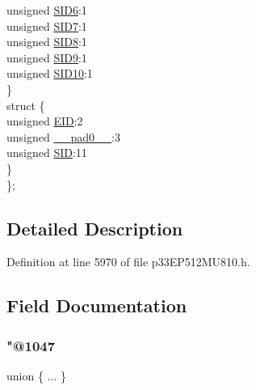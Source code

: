 \begin{DoxyCompactItemize}
\begin{tabbing}
\>\>unsigned \hyperlink{structtag_c2_r_x_m1_s_i_d_b_i_t_s_a70d70952133eb2389d5c326f9f0e8035}{SID6}:1\\
\>\>unsigned \hyperlink{structtag_c2_r_x_m1_s_i_d_b_i_t_s_a34097fb76decd431701fa2d86a22328e}{SID7}:1\\
\>\>unsigned \hyperlink{structtag_c2_r_x_m1_s_i_d_b_i_t_s_afe74894633244fdb0b0c01b4e8c522e7}{SID8}:1\\
\>\>unsigned \hyperlink{structtag_c2_r_x_m1_s_i_d_b_i_t_s_a33587704948067005c2a6a3ccc503c99}{SID9}:1\\
\>\>unsigned \hyperlink{structtag_c2_r_x_m1_s_i_d_b_i_t_s_a1a9084031c7f5fb16007feeebf0d8216}{SID10}:1\\
\>\} \\
\>struct \{\\
\>\>unsigned \hyperlink{structtag_c2_r_x_m1_s_i_d_b_i_t_s_ae80b378c9141f7c03e0b4e55b5f4b54d}{EID}:2\\
\>\>unsigned \hyperlink{structtag_c2_r_x_m1_s_i_d_b_i_t_s_adf71f3d8410c1f1dbbc96680a92c49af}{\_\_pad0\_\_}:3\\
\>\>unsigned \hyperlink{structtag_c2_r_x_m1_s_i_d_b_i_t_s_af88edf93b2fee2432665bd84f51287e4}{SID}:11\\
\>\} \\
\}; \\

\end{tabbing}\end{DoxyCompactItemize}


\subsection{Detailed Description}


Definition at line 5970 of file p33\+E\+P512\+M\+U810.\+h.



\subsection{Field Documentation}
\mbox{\label{structtag_c2_r_x_m1_s_i_d_b_i_t_s_ac9c6dee7accd571e1e218fb8043544c2}} 
\subsubsection{\texorpdfstring{"@1047}{@1047}}
{\footnotesize\ttfamily union \{ ... \} }

\mbox{\label{structtag_c2_r_x_m1_s_i_d_b_i_t_s_adf71f3d8410c1f1dbbc96680a92c49af}} 
